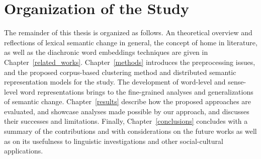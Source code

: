 \section{Organization of the Study}
The remainder of this thesis is organized as follows. An theoretical overview and reflections of lexical semantic change in general, the concept of home in literature, as well as the diachronic word embeddings techniques are given in Chapter~\ref{related_works}. Chapter~\ref{methods} introduces the preprocessing issues, and the proposed corpus-based clustering method and distributed semantic representation models for the study. The development of word-level and sense-level word representations brings to the fine-grained analyses and generalizations of semantic change. Chapter~\ref{results} describe how the proposed approaches are evaluated, and showcase analyses made possible by our approach, and discusses their successes and limitations. Finally, Chapter~\ref{conclusions} concludes with a summary of the contributions and with considerations on the future works as well as on its usefulness to linguistic investigations and other social-cultural  applications.

